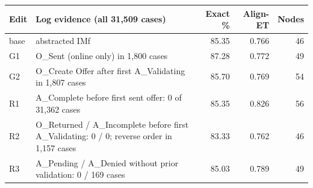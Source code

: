 \begin{tabular}{lp{9cm}rrr}
\hline
Edit & Log evidence (all 31,509 cases) & Exact \% & Align-ET & Nodes \\
\hline
base & abstracted IMf & 85.35 & 0.766 & 46 \\
G1 & O\_Sent (online only) in 1,800 cases & 87.28 & 0.772 & 49 \\
G2 & O\_Create Offer after first A\_Validating in 1,807 cases & 85.70 & 0.769 & 54 \\
R1 & A\_Complete before first sent offer: 0 of 31,362 cases & 85.35 & 0.826 & 56 \\
R2 & O\_Returned / A\_Incomplete before first A\_Validating: 0 / 0; reverse order in 1,157 cases & 83.33 & 0.762 & 46 \\
R3 & A\_Pending / A\_Denied without prior validation: 0 / 169 cases & 85.03 & 0.789 & 49 \\
\hline
\end{tabular}
